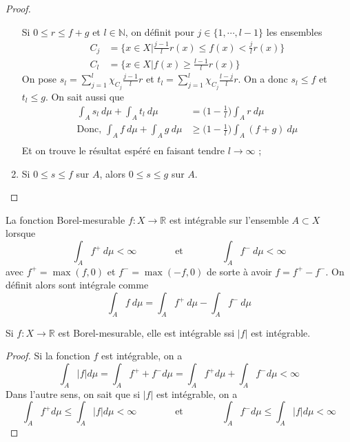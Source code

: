 \begin{proof}
\begin{enumerate}[label=(\roman*)]
        Si $0\leq r\leq f+g$ et $l\in\mathbb{N}$, on définit pour $j\in\{1,\cdots,l-1\}$ les ensembles
        \begin{align*}
            C_j &= \{x\in X\big|\frac{j-1}{l}r(x)\leq f(x)<\frac{j}{l}r(x)\}\\
            C_l &= \{x\in X\big|f(x)\geq\frac{l-1}{l}r(x)\}
        \end{align*}
        On pose $s_l=\sum_{j=1}^l\chi_{C_j}\frac{j-1}{l}r$ et $t_l=\sum_{j=1}^l \chi_{C_j}\frac{l-j}{l}r$. On a donc $s_l\leq f$ et $t_l\leq g$. On sait aussi que
        \begin{align*}
            \int_As_l\ d\mu + \int_A t_l\ d\mu &= \big(1-\frac{1}{l}\big)\int_Ar\ d\mu\\
            \text{Donc, } \int_Af\ d\mu + \int_A g\ d\mu &\geq \big(1-\frac{1}{l}\big)\int_A(f+g)\ d\mu\\
        \end{align*}
        Et on trouve le résultat espéré en faisant tendre $l\to\infty$ ;
        \item Si $0\leq s\leq f$ sur $A$, alors $0\leq s\leq g$ sur $A$.
    \end{enumerate}
\end{proof}

\begin{definition}
    La fonction Borel-mesurable $f:X\to\mathbb{R}$ est intégrable sur l'ensemble $A\subset X$ lorsque
    \begin{equation*}
        \int_Af^+\ d\mu<\infty \qquad\qquad \text{et} \qquad\qquad \int_Af^-\ d\mu<\infty
    \end{equation*}
    avec $f^+=\max(f,0)$ et $f^-=\max(-f,0)$ de sorte à avoir $f=f^+-f^-$. On définit alors sont intégrale comme
    \begin{equation*}
        \int_A f\ d\mu = \int_Af^+\ d\mu -\int_Af^-\ d\mu
    \end{equation*}
\end{definition}

\begin{theo}
    Si $f:X\to\mathbb{R}$ est Borel-mesurable, elle est intégrable ssi $|f|$ est intégrable.
\end{theo}
\begin{proof}
    Si la fonction $f$ est intégrable, on a
    \begin{equation*}
        \int_A|f|d\mu = \int_Af^++f^-d\mu = \int_Af^+d\mu+\int_Af^-d\mu<\infty
    \end{equation*}
    Dans l'autre sens, on sait que si $|f|$ est intégrable, on a
    \begin{equation*}
        \int_Af^+d\mu \leq \int_A|f|d\mu<\infty \qquad\qquad \text{et} \qquad\qquad \int_Af^-d\mu\leq\int_A|f|d\mu<\infty
    \end{equation*}
\end{proof}

